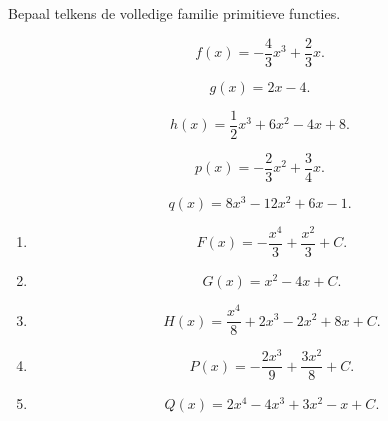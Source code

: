 \documentclass{ximera}
\begin{document}
\begin{oefening}{\oefB\ESS}

Bepaal telkens de volledige familie primitieve functies.

\begin{question}
\[
f(x)=-\frac{4}{3}x^3+\frac{2}{3}x.
\]
\end{question}

\begin{question}
\[
g(x)=2x-4.
\]
\end{question}

\begin{question}
\[
h(x)=\frac12x^3+6x^2-4x+8.
\]
\end{question}

\begin{question}
\[
p(x)=-\frac23x^2+\frac34x.
\]
\end{question}

\begin{question}
\[
q(x)=8x^3-12x^2+6x-1.
\]
\end{question}

\begin{oplossing}

\begin{enumerate}
\item
\[
F(x)=-\frac{x^4}{3}+\frac{x^2}{3}+C.
\]

\item
\[
G(x)=x^2-4x+C.
\]

\item
\[
H(x)=\frac{x^4}{8}+2x^3-2x^2+8x+C.
\]

\item
\[
P(x)=-\frac{2x^3}{9}+\frac{3x^2}{8}+C.
\]

\item
\[
Q(x)=2x^4-4x^3+3x^2-x+C.
\]
\end{enumerate}

\end{oplossing}

\end{oefening}


\end{document}
